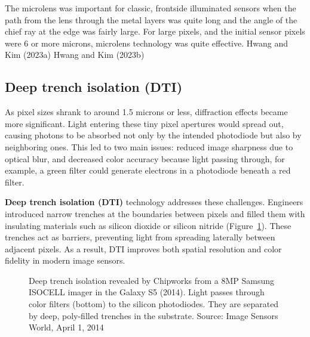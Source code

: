 \documentclass[
  letterpaper,
]{book}
\begin{document}
The microlens was important for classic, frontside illuminated sensors
when the path from the lens through the metal layers was quite long and
the angle of the chief ray at the edge was fairly large. For large
pixels, and the initial sensor pixels were 6 or more microns, microlens
technology was quite effective. Hwang and Kim (2023a) Hwang and Kim
(2023b)

\subsection{Deep trench isolation (DTI)}\label{sec-sensor-dti}

As pixel sizes shrank to around 1.5 microns or less, diffraction effects
became more significant. Light entering these tiny pixel apertures would
spread out, causing photons to be absorbed not only by the intended
photodiode but also by neighboring ones. This led to two main issues:
reduced image sharpness due to optical blur, and decreased color
accuracy because light passing through, for example, a green filter
could generate electrons in a photodiode beneath a red filter.

\textbf{Deep trench isolation (DTI)} technology addresses these
challenges. Engineers introduced narrow trenches at the boundaries
between pixels and filled them with insulating materials such as silicon
dioxide or silicon nitride (Figure~\ref{fig-sensor-deeptrench}). These
trenches act as barriers, preventing light from spreading laterally
between adjacent pixels. As a result, DTI improves both spatial
resolution and color fidelity in modern image sensors.

\begin{figure}


\caption{\label{fig-sensor-deeptrench}Deep trench isolation revealed by
Chipworks from a 8MP Samsung ISOCELL imager in the Galaxy S5 (2014).
Light passes through color filters (bottom) to the silicon photodiodes.
They are separated by deep, poly-filled trenches in the substrate.
Source: Image Sensors World, April 1, 2014}

\end{figure}%
\end{document}
